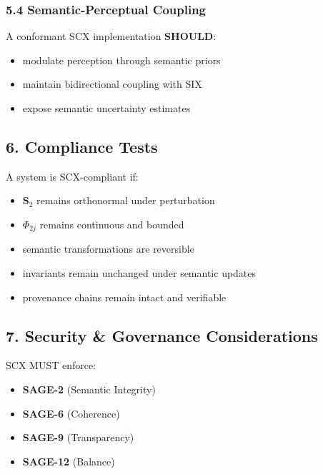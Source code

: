 \subsubsection{5.4 Semantic-Perceptual Coupling}\label{semantic-perceptual-coupling}

A conformant SCX implementation \textbf{SHOULD}:

\begin{itemize}
\tightlist
\item
  modulate perception through semantic priors
\item
  maintain bidirectional coupling with SIX
\item
  expose semantic uncertainty estimates
\end{itemize}

\subsection{6. Compliance Tests}\label{compliance-tests}

A system is SCX-compliant if:

\begin{itemize}
\tightlist
\item
  \(\mathbf{S}_2\) remains orthonormal under perturbation
\item
  \(\Phi_{2j}\) remains continuous and bounded
\item
  semantic transformations are reversible
\item
  invariants remain unchanged under semantic updates
\item
  provenance chains remain intact and verifiable
\end{itemize}

\subsection{7. Security \& Governance Considerations}\label{security-governance-considerations}

SCX MUST enforce:

\begin{itemize}
\tightlist
\item
  \textbf{SAGE-2} (Semantic Integrity)
\item
  \textbf{SAGE-6} (Coherence)
\item
  \textbf{SAGE-9} (Transparency)
\item
  \textbf{SAGE-12} (Balance)
\end{itemize}

